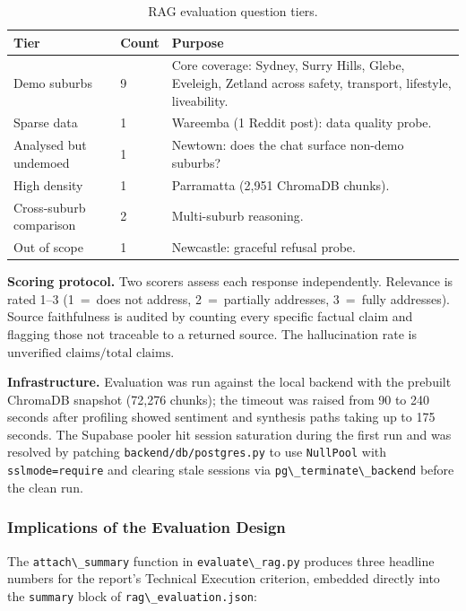 \documentclass[11pt,a4paper]{article}
\newcommand{\passthrough}[1]{#1}
\begin{document}
\begin{table}[H]
\centering
\caption{RAG evaluation question tiers.}
\begin{tabular}{|L{0.28\textwidth}|L{0.08\textwidth}|L{0.50\textwidth}|}
\hline
\textbf{Tier} & \textbf{Count} & \textbf{Purpose} \\
\hline
Demo suburbs & 9 & Core coverage: Sydney, Surry Hills, Glebe, Eveleigh, Zetland across safety, transport, lifestyle, liveability. \\
\hline
Sparse data & 1 & Wareemba (1 Reddit post): data quality probe. \\
\hline
Analysed but undemoed & 1 & Newtown: does the chat surface non-demo suburbs? \\
\hline
High density & 1 & Parramatta (2,951 ChromaDB chunks). \\
\hline
Cross-suburb comparison & 2 & Multi-suburb reasoning. \\
\hline
Out of scope & 1 & Newcastle: graceful refusal probe. \\
\hline
\end{tabular}
\label{tab:eval-tiers}
\end{table}

\textbf{Scoring protocol.} Two scorers assess each response independently. Relevance is rated 1--3 (1~=~does not address, 2~=~partially addresses, 3~=~fully addresses). Source faithfulness is audited by counting every specific factual claim and flagging those not traceable to a returned source. The hallucination rate is $\text{unverified claims} / \text{total claims}$.

\textbf{Infrastructure.} Evaluation was run against the local backend with the prebuilt ChromaDB snapshot (72,276 chunks); the timeout was raised from 90 to 240 seconds after profiling showed sentiment and synthesis paths taking up to 175 seconds. The Supabase pooler hit session saturation during the first run and was resolved by patching \passthrough{\lstinline!backend/db/postgres.py!} to use \passthrough{\lstinline!NullPool!} with \passthrough{\lstinline!sslmode=require!} and clearing stale sessions via \passthrough{\lstinline!pg\_terminate\_backend!} before the clean run.

\subsubsection{Implications of the Evaluation Design}\label{537-implications-of-evaluation-design}

The \passthrough{\lstinline!attach\_summary!} function in \passthrough{\lstinline!evaluate\_rag.py!} produces three headline numbers for the report's Technical Execution criterion, embedded directly into the \passthrough{\lstinline!summary!} block of \passthrough{\lstinline!rag\_evaluation.json!}:
\end{document}

